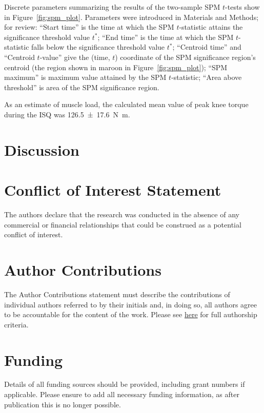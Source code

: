 \documentclass[utf8]{style/FrontiersinHarvard}
\begin{document}
\begin{table}[htb!]
    \centering
    \caption{
        Discrete parameters summarizing the results of the two-sample SPM $ t $-tests show in Figure~\ref{fig:spm_plot}.
        Parameters were introduced in Materials and Methods; for review:
        ``Start time'' is the time at which the SPM $ t $-statistic attains the significance threshold value $ t^{*} $;
        ``End time'' is the time at which the SPM $ t $-statistic falls below the significance threshold value $ t^{*} $;
        ``Centroid time'' and ``Centroid $ t $-value'' give the (time, $ t $) coordinate of the SPM significance region's centroid (the region shown in maroon in Figure~\ref{fig:spm_plot});
        ``SPM maximum'' is maximum value attained by the SPM $ t $-statistic;
        ``Area above threshold'' is area of the SPM significance region.
    }
    \vspace{1ex}

    \renewcommand{\arraystretch}{1.1}
    
    \label{tab:spm_params}
\end{table}

As an estimate of muscle load, the calculated mean value of peak knee torque during the ISQ was \SI{126.5 \pm 17.6}{\newton \meter}.

\section{Discussion}

\section*{Conflict of Interest Statement}
The authors declare that the research was conducted in the absence of any commercial or financial relationships that could be construed as a potential conflict of interest.

\section*{Author Contributions}
The Author Contributions statement must describe the contributions of individual authors referred to by their initials and, in doing so, all authors agree to be accountable for the content of the work.
Please see \href{https://www.frontiersin.org/about/policies-and-publication-ethics#AuthorshipAuthorResponsibilities}{here} for full authorship criteria.

\section*{Funding}
Details of all funding sources should be provided, including grant numbers if applicable.
Please ensure to add all necessary funding information, as after publication this is no longer possible.
\end{document}
